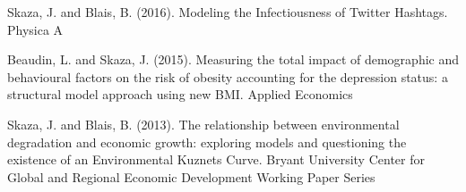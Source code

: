 \documentclass[letterpaper]{twentysecondcv} %
\begin{document}
Skaza, J. and Blais, B. (2016). Modeling the Infectiousness of Twitter Hashtags. Physica A
	
Beaudin, L. and Skaza, J. (2015). Measuring the total impact of demographic and behavioural factors on the risk of obesity accounting for the depression status: a structural model approach using new BMI. Applied Economics
	
Skaza, J. and Blais, B. (2013). The relationship between environmental degradation and economic growth: exploring models and questioning the existence of an Environmental Kuznets Curve. Bryant University Center for Global and Regional Economic Development Working Paper Series

\end{document}

